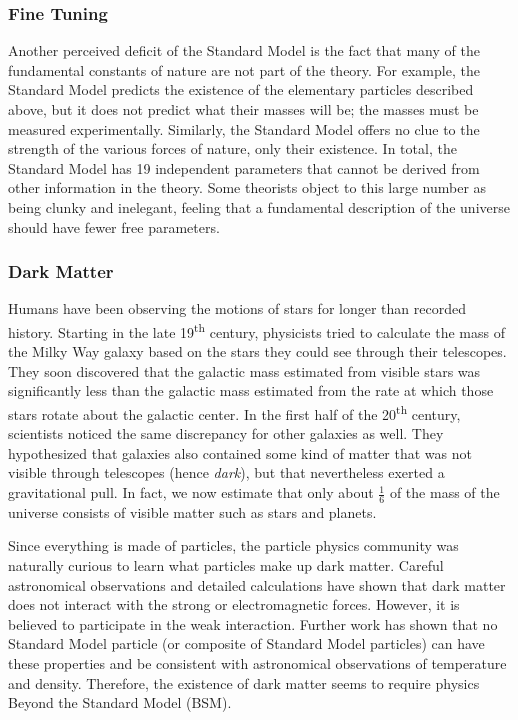 \subsubsection*{Fine Tuning}
Another perceived deficit of the Standard Model is the fact that many
of the fundamental constants of nature are not part of the theory. For
example, the Standard Model predicts the existence of the elementary
particles described above, but it does not predict what their masses will be;
the masses must be measured experimentally. Similarly, the Standard
Model offers no clue to the strength of the various forces of nature,
only their existence. In total, the Standard Model has 19 independent
parameters that cannot be derived from other information in the %
theory. Some theorists object to this large number as being clunky
and inelegant, feeling that a fundamental description of the universe
should have fewer free parameters.

\subsubsection*{Dark Matter}
Humans have been observing the motions of stars
for longer than recorded history. Starting in the late 19\textsuperscript{th}
century, physicists tried to calculate the mass of the Milky Way
galaxy based on the stars they could see through their
telescopes. They soon discovered that the galactic mass estimated from
visible stars was significantly less than the galactic mass
estimated from the rate at which those stars rotate about the %
galactic center. In the first half of the 20\textsuperscript{th}
century, scientists noticed the same discrepancy for other galaxies
as well. They hypothesized that galaxies also contained some kind of
matter that was not visible through telescopes (hence \emph{dark}),
but that nevertheless exerted a gravitational pull. In fact, we now %
estimate that only about $\frac{1}{6}$ of the mass of the universe consists
of visible matter such as stars and planets. %

Since everything is made of particles, the particle physics community
was naturally curious to learn what particles make up dark matter.
Careful astronomical observations and detailed calculations
have shown that dark matter does not interact with the strong or
electromagnetic forces. %
However, it is believed to participate in the weak interaction. %
Further work has shown that no Standard Model particle (or composite
of Standard Model particles) can have these properties and be
consistent with astronomical observations of temperature and %
density. Therefore, the existence of dark matter seems to require
physics Beyond the Standard Model (BSM).

